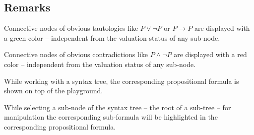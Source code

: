 \subsection{Remarks}

Connective nodes of obvious tautologies like
$P \vee \neg P$ or
$P \rightarrow P$ are displayed with a green color – 
independent from the valuation status of any sub-node.

Connective nodes of obvious contradictions like $P \wedge \neg P$ are displayed with a red color – 
independent from the valuation status of any sub-node.

While working with a syntax tree, the corresponding propositional formula is shown on top of the playground.

While selecting a sub-node of the syntax tree – the root of a sub-tree – 
for manipulation the corresponding sub-formula will be highlighted in the corresponding propositional formula.


